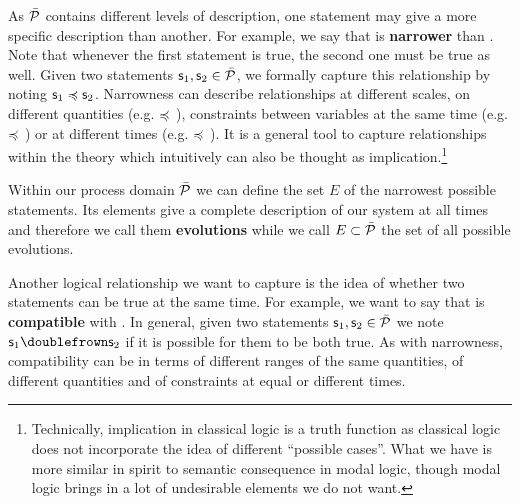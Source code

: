\documentclass[letterpaper]{article}
\begin{document}
As $\tdomain[P]$ contains different levels of description, one statement may give a more specific description than another. For example, we say that  is \textbf{narrower} than . Note that whenever the first statement is true, the second one must be true as well. Given two statements $\stmt_1, \stmt_2 \in \tdomain[P]$, we formally capture this relationship by noting $\stmt_1 \narrower \stmt_2$. Narrowness can describe relationships at different scales, on different quantities (e.g.  $\narrower$ ), constraints between variables at the same time (e.g.  $\narrower$ ) or at different times (e.g.  $\narrower$ ). It is a general tool to capture relationships within the theory which intuitively can also be thought as implication.\footnote{Technically, implication in classical logic is a truth function as classical logic does not incorporate the idea of different ``possible cases''. What we have is more similar in spirit to semantic consequence in modal logic, though modal logic brings in a lot of undesirable elements we do not want.}

Within our process domain $\tdomain[P]$ we can define the set $E$ of the narrowest possible statements. Its elements give a complete description of our system at all times and therefore we call them \textbf{evolutions} while we call $E \subset \tdomain[P]$ the set of all possible evolutions.

Another logical relationship we want to capture is the idea of whether two statements can be true at the same time. For example, we want to say that  is \textbf{compatible} with . In general, given two statements $\stmt_1, \stmt_2 \in \tdomain[P]$ we note $\stmt_1 \comp \stmt_2$ if it is possible for them to be both true. As with narrowness, compatibility can be in terms of different ranges of the same quantities, of different quantities and of constraints at equal or different times.
\end{document}
